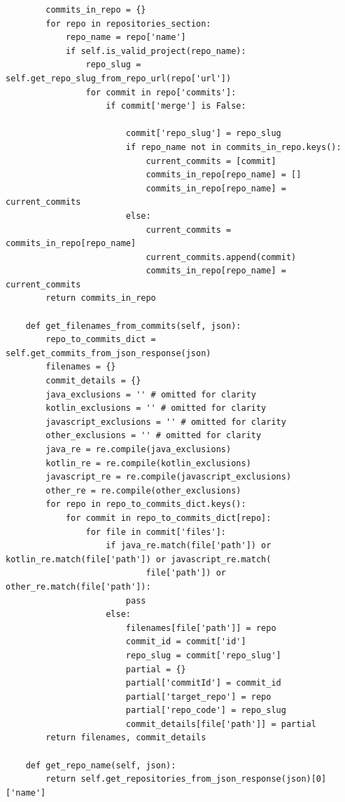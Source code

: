 \begin{landscape}
\begin{code}
\begin{verbatim}
        commits_in_repo = {}
        for repo in repositories_section:
            repo_name = repo['name']
            if self.is_valid_project(repo_name):
                repo_slug = self.get_repo_slug_from_repo_url(repo['url'])
                for commit in repo['commits']:
                    if commit['merge'] is False:

                        commit['repo_slug'] = repo_slug
                        if repo_name not in commits_in_repo.keys():
                            current_commits = [commit]
                            commits_in_repo[repo_name] = []
                            commits_in_repo[repo_name] = current_commits
                        else:
                            current_commits = commits_in_repo[repo_name]
                            current_commits.append(commit)
                            commits_in_repo[repo_name] = current_commits
        return commits_in_repo

    def get_filenames_from_commits(self, json):
        repo_to_commits_dict = self.get_commits_from_json_response(json)
        filenames = {}
        commit_details = {}
        java_exclusions = '' # omitted for clarity
        kotlin_exclusions = '' # omitted for clarity
        javascript_exclusions = '' # omitted for clarity
        other_exclusions = '' # omitted for clarity
        java_re = re.compile(java_exclusions)
        kotlin_re = re.compile(kotlin_exclusions)
        javascript_re = re.compile(javascript_exclusions)
        other_re = re.compile(other_exclusions)
        for repo in repo_to_commits_dict.keys():
            for commit in repo_to_commits_dict[repo]:
                for file in commit['files']:
                    if java_re.match(file['path']) or kotlin_re.match(file['path']) or javascript_re.match(
                            file['path']) or other_re.match(file['path']):
                        pass
                    else:
                        filenames[file['path']] = repo
                        commit_id = commit['id']
                        repo_slug = commit['repo_slug']
                        partial = {}
                        partial['commitId'] = commit_id
                        partial['target_repo'] = repo
                        partial['repo_code'] = repo_slug
                        commit_details[file['path']] = partial
        return filenames, commit_details

    def get_repo_name(self, json):
        return self.get_repositories_from_json_response(json)[0]['name']
\end{verbatim}
\end{code}


\end{landscape}
